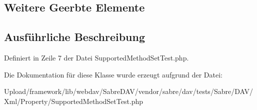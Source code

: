 \subsection*{Weitere Geerbte Elemente}


\subsection{Ausführliche Beschreibung}


Definiert in Zeile 7 der Datei Supported\+Method\+Set\+Test.\+php.



Die Dokumentation für diese Klasse wurde erzeugt aufgrund der Datei\+:\begin{DoxyCompactItemize}
\item 
Upload/framework/lib/webdav/\+Sabre\+D\+A\+V/vendor/sabre/dav/tests/\+Sabre/\+D\+A\+V/\+Xml/\+Property/Supported\+Method\+Set\+Test.\+php\end{DoxyCompactItemize}
